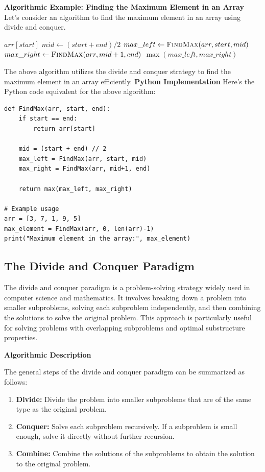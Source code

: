 \documentclass[12pt]{book} %
\begin{document}
\textbf{Algorithmic Example: Finding the Maximum Element in an Array}
Let's consider an algorithm to find the maximum element in an array using divide and conquer.
\FloatBarrier
\begin{algorithm}
\caption{Find Maximum Element}\label{max_element}
\begin{algorithmic}[1]
        \State \Return $arr[start]$
    \EndIf
    \State $mid \gets (start + end) / 2$
    \State $max\_left \gets \Call{FindMax}{arr, start, mid}$
    \State $max\_right \gets \Call{FindMax}{arr, mid+1, end}$
    \State \Return $\max(max\_left, max\_right)$
\EndFunction
\end{algorithmic}
\end{algorithm}
\FloatBarrier
The above algorithm utilizes the divide and conquer strategy to find the maximum element in an array efficiently.
\FloatBarrier
\textbf{Python Implementation}
Here's the Python code equivalent for the above algorithm:
\FloatBarrier
\begin{lstlisting}
def FindMax(arr, start, end):
    if start == end:
        return arr[start]
    
    mid = (start + end) // 2
    max_left = FindMax(arr, start, mid)
    max_right = FindMax(arr, mid+1, end)
    
    return max(max_left, max_right)

# Example usage
arr = [3, 7, 1, 9, 5]
max_element = FindMax(arr, 0, len(arr)-1)
print("Maximum element in the array:", max_element)
\end{lstlisting}

\subsection{The Divide and Conquer Paradigm}

The divide and conquer paradigm is a problem-solving strategy widely used in computer science and mathematics. It involves breaking down a problem into smaller subproblems, solving each subproblem independently, and then combining the solutions to solve the original problem. This approach is particularly useful for solving problems with overlapping subproblems and optimal substructure properties.

\textbf{Algorithmic Description}

The general steps of the divide and conquer paradigm can be summarized as follows:

\begin{enumerate}
    \item \textbf{Divide:} Divide the problem into smaller subproblems that are of the same type as the original problem.
    \item \textbf{Conquer:} Solve each subproblem recursively. If a subproblem is small enough, solve it directly without further recursion.
    \item \textbf{Combine:} Combine the solutions of the subproblems to obtain the solution to the original problem.
\end{enumerate}
\end{document}
